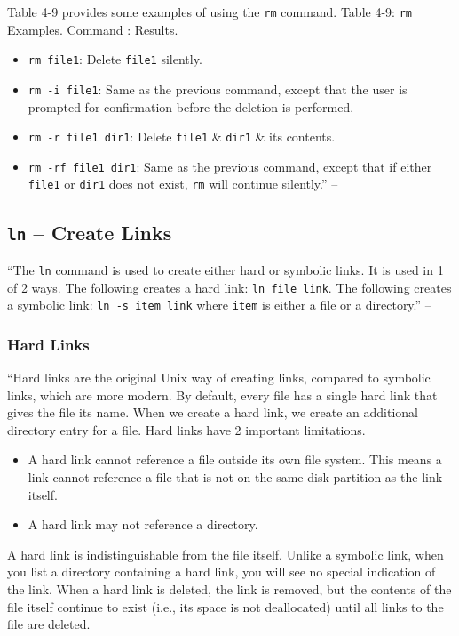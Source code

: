 \documentclass[oneside]{book}
\numberwithin{equation}{section}
\begin{document}
Table 4-9 provides some examples of using the \texttt{rm} command. \textsf{Table 4-9: \texttt{rm} Examples. Command : Results.}
\begin{itemize}
	\item \texttt{rm file1}: Delete \texttt{file1} silently.
	\item \texttt{rm -i file1}: Same as the previous command, except that the user is prompted for confirmation before the deletion is performed.
	\item \texttt{rm -r file1 dir1}: Delete \texttt{file1} \& \texttt{dir1} \& its contents.
	\item \texttt{rm -rf file1 dir1}: Same as the previous command, except that if either \texttt{file1} or \texttt{dir1} does not exist, \texttt{rm} will continue silently.'' -- \cite[pp. 71--73]{Shotts2019}
\end{itemize}

\subsection{\texttt{ln} -- Create Links}
``The \texttt{ln} command is used to create either hard or symbolic links. It is used in 1 of 2 ways. The following creates a hard link: \texttt{ln file link}. The following creates a symbolic link: \texttt{ln -s item link} where \texttt{item} is either a file or a directory.'' -- \cite[p. 73]{Shotts2019}

\subsubsection{Hard Links}
``Hard links are the original Unix way of creating links, compared to symbolic links, which are more modern. By default, every file has a single hard link that gives the file its name. When we create a hard link, we create an additional directory entry for a file. Hard links have 2 important limitations.
\begin{itemize}
	\item A hard link cannot reference a file outside its own file system. This means a link cannot reference a file that is not on the same disk partition as the link itself.
	\item A hard link may not reference a directory.
\end{itemize}
A hard link is indistinguishable from the file itself. Unlike a symbolic link, when you list a directory containing a hard link, you will see no special indication of the link. When a hard link is deleted, the link is removed, but the contents of the file itself continue to exist (i.e., its space is not deallocated) until all links to the file are deleted.
\end{document}
